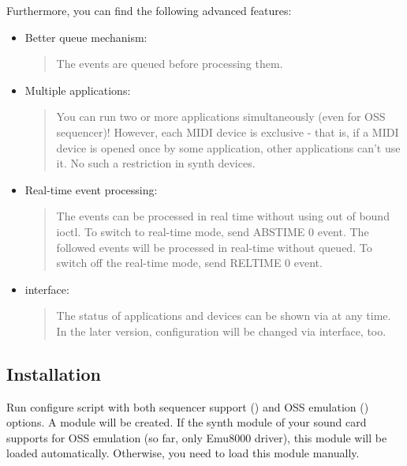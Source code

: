 \documentclass[a4paper,8pt,english]{sphinxmanual}
\begin{document}
Furthermore, you can find the following advanced features:
\begin{itemize}
\item {} 
Better queue mechanism:
\begin{quote}

The events are queued before processing them.
\end{quote}

\item {} 
Multiple applications:
\begin{quote}

You can run two or more applications simultaneously (even for OSS
sequencer)!
However, each MIDI device is exclusive - that is, if a MIDI device
is opened once by some application, other applications can't use
it. No such a restriction in synth devices.
\end{quote}

\item {} 
Real-time event processing:
\begin{quote}

The events can be processed in real time without using out of bound
ioctl. To switch to real-time mode, send ABSTIME 0 event. The followed
events will be processed in real-time without queued. To switch off the
real-time mode, send RELTIME 0 event.
\end{quote}

\item {} 
 interface:
\begin{quote}

The status of applications and devices can be shown via
 at any time. In the later version,
configuration will be changed via  interface, too.
\end{quote}

\end{itemize}


\subsection{Installation}
\label{sound/designs/seq-oss:installation}
Run configure script with both sequencer support ()
and OSS emulation () options. A module 
will be created. If the synth module of your sound card supports for OSS
emulation (so far, only Emu8000 driver), this module will be loaded
automatically.
Otherwise, you need to load this module manually.
\end{document}
